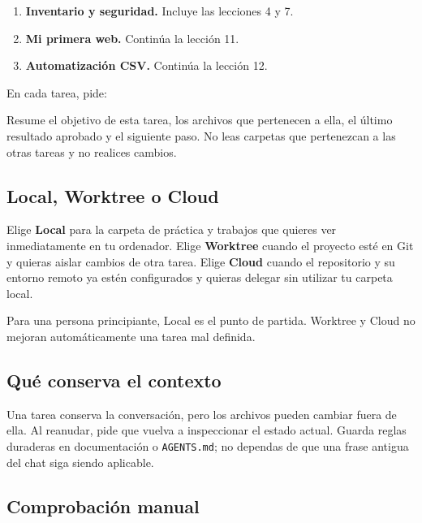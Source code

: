 \documentclass[10pt,a4paper,openany]{book}
\providecommand{\tightlist}{\setlength{\itemsep}{0.18em}\setlength{\parskip}{0pt}}
\newenvironment{Shaded}{}{}
\newcommand{\NormalTok}[1]{#1}
\renewenvironment{Shaded}
  {\begin{tcolorbox}[
    enhanced,
    breakable,
    colback=CodeBg,
    colframe=Border,
    boxrule=0.5pt,
    arc=2mm,
    left=3mm,
    right=3mm,
    top=2.2mm,
    bottom=2.2mm,
    before skip=0.8em,
    after skip=0.9em
  ]}
  {\end{tcolorbox}}
\begin{document}
\begin{enumerate}
\def\labelenumi{\arabic{enumi}.}
\tightlist
\item
  \textbf{Inventario y seguridad.} Incluye las lecciones 4 y 7.
\item
  \textbf{Mi primera web.} Continúa la lección 11.
\item
  \textbf{Automatización CSV.} Continúa la lección 12.
\end{enumerate}

En cada tarea, pide:

\begin{Shaded}
\begin{Highlighting}[]
\NormalTok{Resume el objetivo de esta tarea, los archivos que pertenecen a ella, el último}
\NormalTok{resultado aprobado y el siguiente paso. No leas carpetas que pertenezcan a las}
\NormalTok{otras tareas y no realices cambios.}
\end{Highlighting}
\end{Shaded}

\subsection{Local, Worktree o Cloud}\label{local-worktree-o-cloud}

Elige \textbf{Local} para la carpeta de práctica y trabajos que quieres
ver inmediatamente en tu ordenador. Elige \textbf{Worktree} cuando el
proyecto esté en Git y quieras aislar cambios de otra tarea. Elige
\textbf{Cloud} cuando el repositorio y su entorno remoto ya estén
configurados y quieras delegar sin utilizar tu carpeta local.

Para una persona principiante, Local es el punto de partida. Worktree y
Cloud no mejoran automáticamente una tarea mal definida.

\subsection{Qué conserva el contexto}\label{quuxe9-conserva-el-contexto}

Una tarea conserva la conversación, pero los archivos pueden cambiar
fuera de ella. Al reanudar, pide que vuelva a inspeccionar el estado
actual. Guarda reglas duraderas en documentación o \texttt{AGENTS.md};
no dependas de que una frase antigua del chat siga siendo aplicable.

\subsection{Comprobación manual}\label{comprobaciuxf3n-manual-7}
\end{document}
